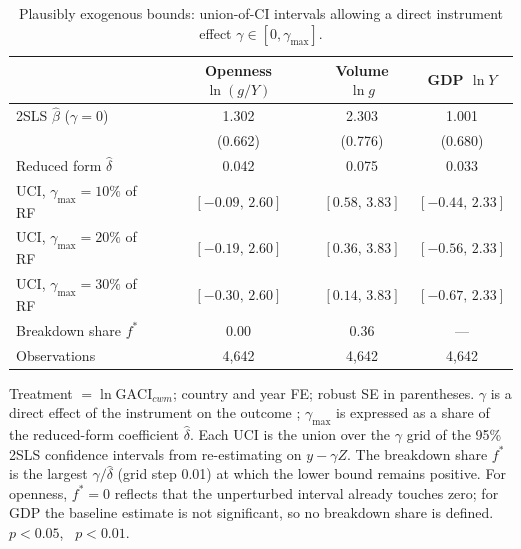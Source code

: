 \begin{table}[H]
\centering
\caption{Plausibly exogenous bounds: union-of-CI intervals allowing a direct
instrument effect $\gamma\in[0,\gamma_{\max}]$.}
\label{tab:conley}
\begin{threeparttable}
\small
\begin{tabular}{lccc}
\toprule
 & Openness $\ln(g/Y)$ & Volume $\ln g$ & GDP $\ln Y$ \\
\midrule
2SLS $\hat\beta$ ($\gamma=0$)   & 1.302\sym{**} & 2.303\sym{***} & 1.001 \\
                                & (0.662)       & (0.776)        & (0.680) \\
Reduced form $\hat\delta$       & 0.042         & 0.075          & 0.033 \\
\addlinespace
UCI, $\gamma_{\max}=10\%$ of RF & $[-0.09,\,2.60]$ & $[0.58,\,3.83]$ & $[-0.44,\,2.33]$ \\
UCI, $\gamma_{\max}=20\%$ of RF & $[-0.19,\,2.60]$ & $[0.36,\,3.83]$ & $[-0.56,\,2.33]$ \\
UCI, $\gamma_{\max}=30\%$ of RF & $[-0.30,\,2.60]$ & $[0.14,\,3.83]$ & $[-0.67,\,2.33]$ \\
Breakdown share $f^{*}$         & 0.00          & 0.36           & --- \\
\midrule
Observations                    & 4{,}642       & 4{,}642        & 4{,}642 \\
\bottomrule
\end{tabular}
\begin{tablenotes}\footnotesize
\item Treatment $=\ln\mathrm{GACI}_{cwm}$; country and year FE; robust SE in
parentheses. $\gamma$ is a direct effect of the instrument on the outcome
\citep{Conley_2012}; $\gamma_{\max}$ is expressed as a share of the
reduced-form coefficient $\hat\delta$. Each UCI is the union over the
$\gamma$ grid of the 95\% 2SLS confidence intervals from re-estimating on
$y-\gamma Z$. The breakdown share $f^{*}$ is the largest $\gamma/\hat\delta$
(grid step 0.01) at which the lower bound remains positive. For openness,
$f^{*}=0$ reflects that the unperturbed interval already touches zero; for
GDP the baseline estimate is not significant, so no breakdown share is
defined.
\sym{**}~$p<0.05$, \sym{***}~$p<0.01$.
\end{tablenotes}
\end{threeparttable}
\end{table}

